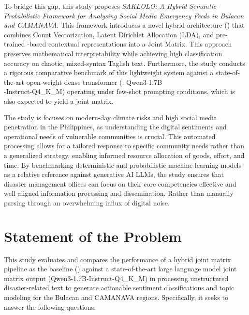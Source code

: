 To bridge this gap, this study proposes \emph{SAKLOLO: A Hybrid
	Semantic-Probabilistic Framework for Analysing Social Media Emergency Feeds in
	Bulacan and CAMANAVA}. This framework introduces a novel hybrid architecture
(\sysA) that combines Count Vectorization, Latent Dirichlet Allocation (LDA),
and pre-trained \xlmr-based contextual representations into a Joint Matrix.
This approach preserves mathematical interpretability while achieving high
classification accuracy on chaotic, mixed-syntax Taglish text. Furthermore,
the study conducts a rigorous comparative benchmark of this lightweight system
against a state-of-the-art open-weight dense transformer (\sysB: Qwen3-1.7B\\
-Instruct-Q4\_K\_M) operating under few-shot prompting conditions, 
which is also expected to yield a joint matrix.

The study is focuses on modern-day climate risks and high social media
penetration in the Philippines, as understanding the digital sentiments and
operational needs of vulnerable communities is crucial. This automated
processing allows for a tailored response to specific community needs rather
than a generalized strategy, enabling informed resource allocation of goods,
effort, and time. By benchmarking deterministic and probabilistic machine
learning models as a relative reference against generative AI LLMs, the study ensures that
disaster management offices can focus on their core competencies effective and well aligned 
information processing and dissemination. Rather than manually parsing through an overwhelming
influx of digital noise.

\section*{Statement of the Problem}

This study evaluates and compares the performance of a hybrid joint matrix
pipeline as the baseline (\sysA) against a state-of-the-art large language
model joint matrix output (Qwen3-1.7B-Instruct-Q4\_K\_M) in processing unstructured disaster-related
text to generate actionable sentiment classifications and topic modeling for the Bulacan and CAMANAVA regions. Specifically, it seeks to
answer the following questions:


